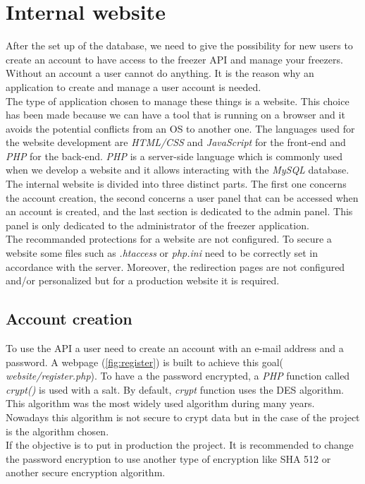 \section{Internal website}
After the set up of the database, we need to give the possibility for new users to create an account to have access to the freezer API and manage your freezers. Without an account a user cannot do anything. It is the reason why an application to create and manage a user account is needed.\\

The type of application chosen to manage these things is a website. This choice has been made because we can have a tool that is running on a browser and it avoids the potential conflicts from an OS to another one. The languages used for the website development are \textit{HTML/CSS} and \textit{JavaScript} for the front-end and \textit{PHP} for the back-end. \textit{PHP} is a server-side language which is commonly used when we develop a website and it allows interacting with the \textit{MySQL} database. \\

The internal website is divided into three distinct parts. The first one concerns the account creation, the second concerns a user panel that can be accessed when an account is created, and the last section is dedicated to the admin panel. This panel is only dedicated to the administrator of the freezer application. \\

The recommanded protections for a website are not configured. To secure a website some files such as \textit{.htaccess} or \textit{php.ini} need to be correctly set in accordance with the server. Moreover, the redirection pages are not configured and/or personalized but for a production website it is required.

\subsection{Account creation}
To use the API a user need to create an account with an e-mail address and a password. A webpage (\autoref{fig:register}) is built to achieve this goal( \textit{website/register.php}). To have a the password encrypted, a \textit{PHP} function called \textit{crypt()} is used with a salt. By default, \textit{crypt} function uses the DES algorithm. This algorithm was the most widely used algorithm during many years. Nowadays this algorithm is not secure to crypt data but in the case of the project is the algorithm chosen.\\
If the objective is to put in production the project. It is recommended to change the password encryption to use another type of encryption like SHA 512 or another secure encryption algorithm.\\

